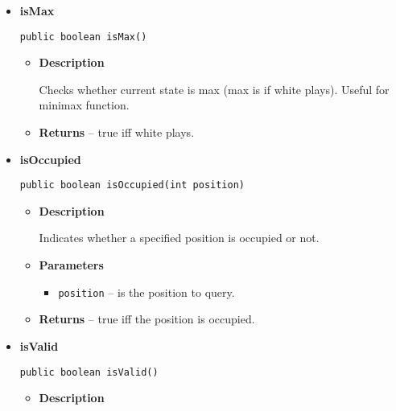 \documentclass[11pt,a4paper]{report}
\begin{document}
{{{{{{{{{{{\begin{itemize}
{\begin{itemize}
{Checks whether given position belongs to a mill.
}
\item{
{\bf  Parameters}
  \begin{itemize}
   \item{
\texttt{position} -- is the position to query.}
  \end{itemize}
}%
\item{{\bf  Returns} -- 
true iff position is in a mill. 
}%
\end{itemize}
}%
\item{ 
{\bf  isMax}\\
\begin{lstlisting}[frame=none]
public boolean isMax()\end{lstlisting} %
\begin{itemize}
\item{
{\bf  Description}

Checks whether current state is max (max is if white plays). Useful for minimax function.
}
\item{{\bf  Returns} -- 
true iff white plays. 
}%
\end{itemize}
}%
\item{ 
{\bf  isOccupied}\\
\begin{lstlisting}[frame=none]
public boolean isOccupied(int position)\end{lstlisting} %
\begin{itemize}
\item{
{\bf  Description}

Indicates whether a specified position is occupied or not.
}
\item{
{\bf  Parameters}
  \begin{itemize}
   \item{
\texttt{position} -- is the position to query.}
  \end{itemize}
}%
\item{{\bf  Returns} -- 
true iff the position is occupied. 
}%
\end{itemize}
}%
\item{ 
{\bf  isValid}\\
\begin{lstlisting}[frame=none]
public boolean isValid()\end{lstlisting} %
\begin{itemize}
\item{
{\bf  Description}

}
\end{itemize}}
\end{itemize}}}}}}}}}}}}
\end{document}
